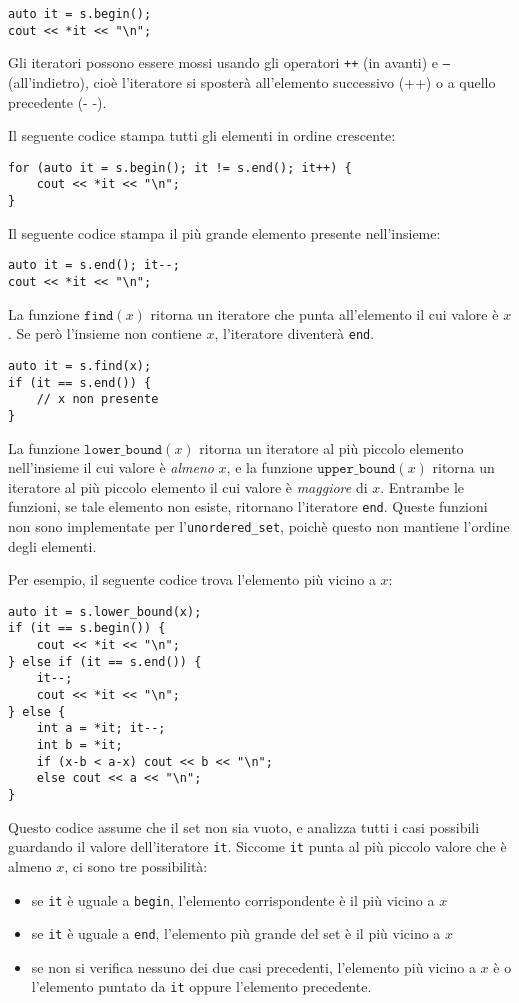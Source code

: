 \begin{lstlisting}
auto it = s.begin();
cout << *it << "\n";
\end{lstlisting}

Gli iteratori possono essere mossi usando gli operatori
\texttt{++} (in avanti) e \texttt{--} (all'indietro),
cioè l'iteratore si sposterà all'elemento successivo (++)
o a quello precedente (- -).

Il seguente codice stampa tutti gli elementi in ordine crescente:
\begin{lstlisting}
for (auto it = s.begin(); it != s.end(); it++) {
    cout << *it << "\n";
}
\end{lstlisting}
Il seguente codice stampa il più grande elemento presente nell'insieme:
\begin{lstlisting}
auto it = s.end(); it--;
cout << *it << "\n";
\end{lstlisting}

La funzione $\texttt{find}(x)$ ritorna un iteratore che punta
all'elemento il cui valore è $x$.
Se però l'insieme non contiene $x$,
l'iteratore diventerà \texttt{end}.

\begin{lstlisting}
auto it = s.find(x);
if (it == s.end()) {
    // x non presente
}
\end{lstlisting}

La funzione $\texttt{lower\_bound}(x)$ ritorna 
un iteratore al più piccolo elemento nell'insieme
il cui valore è \emph{almeno} $x$, e 
la funzione $\texttt{upper\_bound}(x)$
ritorna un iteratore al più piccolo elemento il cui
valore è \emph{maggiore} di $x$.
Entrambe le funzioni, se tale elemento non esiste,
ritornano l'iteratore \texttt{end}.
Queste funzioni non sono implementate per 
l'\texttt{unordered\_set}, poichè questo non 
mantiene l'ordine degli elementi.

\begin{samepage}
Per esempio, il seguente codice trova l'elemento più vicino a $x$:

\begin{lstlisting}
auto it = s.lower_bound(x);
if (it == s.begin()) {
    cout << *it << "\n";
} else if (it == s.end()) {
    it--;
    cout << *it << "\n";
} else {
    int a = *it; it--;
    int b = *it;
    if (x-b < a-x) cout << b << "\n";
    else cout << a << "\n";
}
\end{lstlisting}

Questo codice assume che il set non sia vuoto,
e analizza tutti i casi possibili guardando il valore 
dell'iteratore \texttt{it}.
Siccome \texttt{it} punta al più piccolo 
valore che è almeno $x$, ci sono tre possibilità:
\begin{itemize}
\item se \texttt{it} è uguale a \texttt{begin},
l'elemento corrispondente è il più vicino a $x$ 
\item se \texttt{it} è uguale a \texttt{end},
l'elemento più grande del set è il più vicino a $x$ 
\item se non si verifica nessuno dei due casi precedenti,
l'elemento più vicino a $x$ è o l'elemento puntato da
\texttt{it} oppure l'elemento precedente.
\end{itemize}
\end{samepage}

